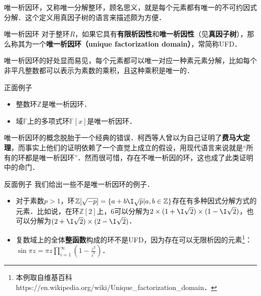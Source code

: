 


唯一析因环，又称唯一分解整环，顾名思义，就是每个元素都有唯一的不可约因式分解．这个定义用真因子树的语言来描述颇为方便．

\begin{definition}{唯一析因环}
对于整环$R$，如果它具有\textbf{有限析因性}和\textbf{唯一析因性}（见\textbf{真因子树}），那么称其为一个\textbf{唯一析因环（unique factorization domain）}，常简称UFD．
\end{definition}

唯一析因环的好处显而易见，每个元素都可以唯一对应一种素元素分解，比如每个非平凡整数都可以表示为素数的乘积，且这种乘积是唯一的．

\begin{example}{正面例子}
\begin{itemize}
\item 整数环$\mathbb{Z}$是唯一析因环．
\item 域$\mathbb{F}$上的多项式环$\mathbb{F}[x]$是唯一析因环．
\end{itemize}
\end{example}

唯一析因环的概念脱胎于一个经典的错误．柯西等人曾以为自己证明了\textbf{费马大定理}，而事实上他们的证明依赖了一个直觉上成立的假设，用现代语言来说就是“所有的环都是唯一析因环”．然而很可惜，存在不唯一析因的环，这也成了此类证明中的命门．

\begin{example}{反面例子}
我们给出一些不是唯一析因环的例子．
\begin{itemize}
\item 对于素数$p>1$，环$\mathbb{Z}[\sqrt{-p}]=\{a+b\I\sqrt{p}|a, b\in\mathbb{Z}\}$存在有多种因式分解方式的元素．比如说，在环$\mathbb{Z}[2]$上，$6$可以分解为$2\times (1+\I\sqrt{2})\times(1-\I\sqrt{2})$，也可以分解为$(2+\I\sqrt{2})\times(2-\I\sqrt{2})$．
\item 复数域上的全体\textbf{整函数}构成的环不是UFD，因为存在可以无限析因的元素\footnote{本例取自维基百科https://en.wikipedia.org/wiki/Unique_factorization_domain．}：$\sin{\pi z=\pi z\prod\limits_{i=1}^\infty(1-\frac{z^2}{i^2})}$．
\end{itemize}
\end{example}







